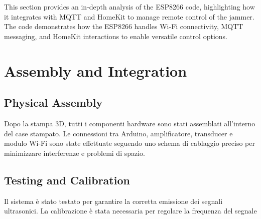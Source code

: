 This section provides an in-depth analysis of the ESP8266 code, highlighting how it integrates with MQTT and HomeKit to manage remote control of the jammer. The code demonstrates how the ESP8266 handles Wi-Fi connectivity, MQTT messaging, and HomeKit interactions to enable versatile control options.

\section{Assembly and Integration}

\subsection{Physical Assembly}
Dopo la stampa 3D, tutti i componenti hardware sono stati assemblati all'interno del case stampato. Le connessioni tra Arduino, amplificatore, transducer e modulo Wi-Fi sono state effettuate seguendo uno schema di cablaggio preciso per minimizzare interferenze e problemi di spazio.

\subsection{Testing and Calibration}
Il sistema è stato testato per garantire la corretta emissione dei segnali ultrasonici. La calibrazione è stata necessaria per regolare la frequenza del segnale
